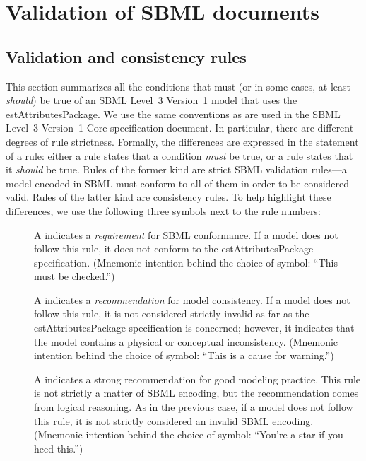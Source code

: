 
\section{Validation of SBML documents}
\label{apdx-validation}

\subsection{Validation and consistency rules}
\label{validation-rules}

This section summarizes all the conditions that must (or in some cases,
at least \emph{should}) be true of an SBML Level~3 Version~1 model that
uses the estAttributesPackage. We use the same conventions as are used
in the SBML Level~3 Version~1 Core specification document. In
particular, there are different degrees of rule strictness. Formally,
the differences are expressed in the statement of a rule: either a rule
states that a condition \emph{must} be true, or a rule states that it
\emph{should} be true. Rules of the former kind are strict SBML
validation rules---a model encoded in SBML must conform to all of them
in order to be considered valid. Rules of the latter kind are
consistency rules. To help highlight these differences, we use the
following three symbols next to the rule numbers:

\begin{description}

\item[\hspace*{6.5pt}\vSymbol\vsp] A \vSymbolName indicates a
\emph{requirement} for SBML conformance. If a model does not follow this
rule, it does not conform to the estAttributesPackage specification.
(Mnemonic intention behind the choice of symbol: ``This must be
checked.'')

\item[\hspace*{6.5pt}\cSymbol\csp] A \cSymbolName indicates a
\emph{recommendation} for model consistency. If a model does not follow
this rule, it is not considered strictly invalid as far as the
estAttributesPackage specification is concerned; however, it indicates
that the model contains a physical or conceptual inconsistency.
(Mnemonic intention behind the choice of symbol: ``This is a cause for
warning.'')

\item[\hspace*{6.5pt}\mSymbol\msp] A \mSymbolName indicates a strong
recommendation for good modeling practice. This rule is not strictly a
matter of SBML encoding, but the recommendation comes from logical
reasoning. As in the previous case, if a model does not follow this
rule, it is not strictly considered an invalid SBML encoding. (Mnemonic
intention behind the choice of symbol: ``You're a star if you heed
this.'')

\end{description}

